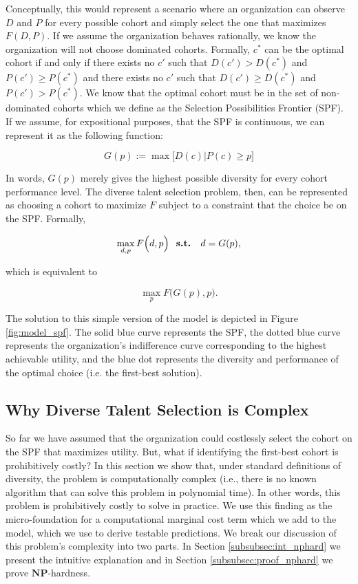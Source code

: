 Conceptually, this would represent a scenario where an organization can observe $D$ and $P$ for every possible cohort and simply select the one that maximizes $F(D,P)$. If we assume the organization behaves rationally, we know the organization will not choose dominated cohorts. Formally, $c^*$ can be the optimal cohort if and only if there exists no $c'$ such that $D(c')>D(c^*)$ and $P(c')\geq P(c^*)$ and there exists no $c'$ such that $D(c')\geq D(c^*)$ and $P(c')> P(c^*)$. We know that the optimal cohort must be in the set of non-dominated cohorts which we define as the Selection Possibilities Frontier (SPF). If we assume, for expositional purposes, that the SPF is continuous, we can represent it as the following function:

\begin{equation}
G(p) := \max\Big[D(c)|P(c) \geq p\Big]
\end{equation}

\noindent In words, $G(p)$ merely gives the highest possible diversity for every cohort performance level. The diverse talent selection problem, then, can be represented as choosing a cohort to maximize $F$ subject to a constraint that the choice be on the SPF. Formally, 

\begin{equation}
\max_{d,p} F\Big(d,p\Big) \text{ \bf{ s.t. } } d = G(p), \nonumber 
\end{equation}

\noindent which is equivalent to

\begin{equation}
\max_{p} F\Big(G(p) ,p\Big). \label{eq:selection_simple}
\end{equation}

The solution to this simple version of the model is depicted in Figure \ref{fig:model_spf}. The solid blue curve represents the SPF, the dotted blue curve represents the organization's indifference curve corresponding to the highest achievable utility, and the blue dot represents the diversity and performance of the optimal choice (i.e. the first-best solution). 

\subsection{Why Diverse Talent Selection is Complex}\label{subsec:dts_nphard}

So far we have assumed that the organization could costlessly select the cohort on the SPF that maximizes utility. But, what if identifying the first-best cohort is prohibitively costly? In this section we show that, under standard definitions of diversity, the problem is computationally complex (i.e., there is no known algorithm that can solve this problem in polynomial time). In other words, this problem is prohibitively costly to solve in practice. We use this finding as the micro-foundation for a computational marginal cost term which we add to the model, which we use to derive testable predictions. We break our discussion of this problem's complexity into two parts. In Section \ref{subsubsec:int_nphard} we present the intuitive explanation and in Section \ref{subsubsec:proof_nphard} we prove $\mathbf{NP}$-hardness. 

